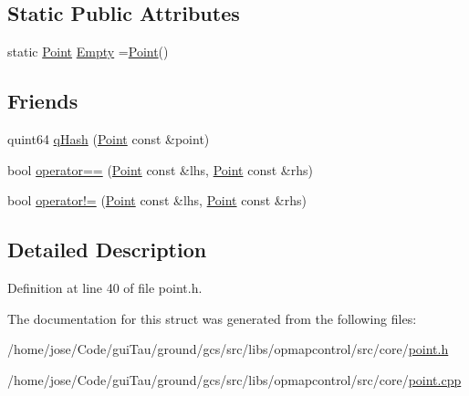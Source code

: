 \subsection*{Static Public Attributes}
\begin{DoxyCompactItemize}
\item 
static \hyperlink{structcore_1_1_point}{Point} \hyperlink{group___o_p_map_widget_ga8f0f8df337a57e048e21c0410bd1a7e3}{Empty} =\hyperlink{structcore_1_1_point}{Point}()
\end{DoxyCompactItemize}
\subsection*{Friends}
\begin{DoxyCompactItemize}
\item 
quint64 \hyperlink{group___o_p_map_widget_ga8feadb5b08ae788a3b3149c500a8577c}{q\-Hash} (\hyperlink{structcore_1_1_point}{Point} const \&point)
\item 
bool \hyperlink{group___o_p_map_widget_gad4a997c3713478cec06dca233eeefdba}{operator==} (\hyperlink{structcore_1_1_point}{Point} const \&lhs, \hyperlink{structcore_1_1_point}{Point} const \&rhs)
\item 
bool \hyperlink{group___o_p_map_widget_ga5f23d9a5e9c27a7fb6560e248ba8950e}{operator!=} (\hyperlink{structcore_1_1_point}{Point} const \&lhs, \hyperlink{structcore_1_1_point}{Point} const \&rhs)
\end{DoxyCompactItemize}


\subsection{Detailed Description}


Definition at line 40 of file point.\-h.



The documentation for this struct was generated from the following files\-:\begin{DoxyCompactItemize}
\item 
/home/jose/\-Code/gui\-Tau/ground/gcs/src/libs/opmapcontrol/src/core/\hyperlink{point_8h}{point.\-h}\item 
/home/jose/\-Code/gui\-Tau/ground/gcs/src/libs/opmapcontrol/src/core/\hyperlink{point_8cpp}{point.\-cpp}\end{DoxyCompactItemize}
